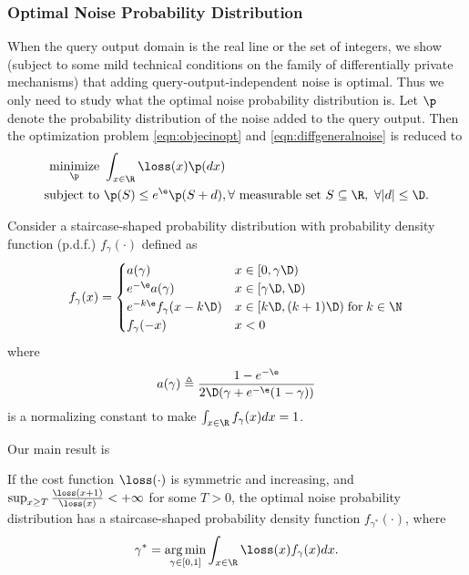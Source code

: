 \subsubsection{Optimal Noise Probability Distribution}

When the query output domain is the real line or the set of integers, we show (subject to some mild technical conditions on the family of differentially private mechanisms) that adding query-output-independent noise is optimal. Thus we only need to study what  the optimal noise probability distribution is. Let $\p$ denote the probability distribution of the noise added to the query output. Then the optimization problem \eqref{eqn:objecinopt} and \eqref{eqn:diffgeneralnoise} is reduced to
\begin{align}
	\mathop{\text{minimize}}\limits_{ \p} & \ \int_{x \in \R} \loss(x) \p (dx) \\
	\text{subject to} & \ \p(S) \le e^{\e} \p(S + d), \forall \ \text{measurable set} \ S\subseteq \R, \ \forall |d| \le \D.  \end{align}



Consider a staircase-shaped probability distribution with probability density function (p.d.f.) $f_{\gamma}(\cdot)$ defined as
\begin{align}
f_{\gamma}(x)  =
\begin{cases}
  	 a(\gamma) & x \in [0, \gamma \D) \\
 e^{-\e} a(\gamma) & x \in [\gamma \D,   \D) \\
  e^{-k\e} f_{\gamma}(x - k\D)  & x \in [ k \D,   (k+1)\D) \; \text{for} \; k \in \N \\
 f_{\gamma}(-x) & x<0
  \end{cases}\end{align}
where
\begin{align}
	a(\gamma) \triangleq \frac{ 1 - e^{-\e}}{2 \D (\gamma + e^{-\e}(1-\gamma))}
\end{align}
is a normalizing constant to make $\int_{x\in \R} f_{\gamma}(x) dx = 1$.


Our main result is
\begin{theorem}
	If the cost function $\loss(\cdot)$ is symmetric and increasing, and $\sup_{x \ge T} \frac{\loss(x+1)}{\loss(x)} < + \infty$ for some $T>0$, the optimal noise probability distribution has a staircase-shaped probability density function $f_{\gamma^*}(\cdot)$, where
	\begin{align}
		\gamma^* = \mathop{\arg \min} \limits_{\gamma \in [0,1] } \int_{x \in \R} \loss (x)  f_{\gamma}(x) dx .
	\end{align}
	
\end{theorem}


